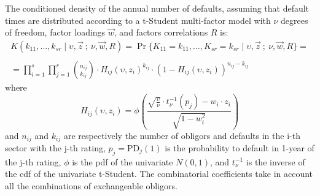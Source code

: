 \documentclass[11pt,fleqn]{book} %
\begin{document}
\begin{proposition}
	The conditioned density of the annual number of defaults, assuming 
	that default times are distributed according to a t-Student multi-factor 
	model with $\nu$ degrees of freedom, factor loadings $\vec{w}$, and 
	factors correlations $R$ is:
	\begin{displaymath}
		\begin{array}{l}
			K(k_{11},\dots,k_{sr} \mid \upsilon,\vec{z}\ ;\ \nu,\vec{w}, R) = 
			\Pr\{K_{11}=k_{11},\dots,K_{sr}=k_{sr} \mid \upsilon,\vec{z}\ ;\ \nu, \vec{w}, R\} = \\
			                                                                                                                                 \\
			= \displaystyle \prod_{i=1}^s \prod_{j=1}^r \binom{n_{ij}}{k_{ij}} \cdot
			H_{ij}(\upsilon,z_i)^{k_{ij}} \cdot
			\left( 1 - H_{ij}(\upsilon,z_i) \right)^{n_{ij}-k_{ij}}
		\end{array}
	\end{displaymath}
	where
	\begin{displaymath}
		H_{ij}(\upsilon,z_i) = \phi\left(  
		\frac{\sqrt{\frac{\upsilon}{\nu}} \cdot t_{\nu}^{-1}(p_j) - w_i\cdot z_i}{\sqrt{1-w_i^2}}
		\right)
	\end{displaymath}
	and $n_{ij}$ and $k_{ij}$ are respectively the number of obligors and 
	defaults in the i-th sector with the j-th rating, $p_j = \text{PD}_j(1)$ 
	is the probability to default in 1-year of the j-th rating,
	$\phi$ is the pdf of the univariate $N(0,1)$, and $t_{\nu}^{-1}$ is the 
	inverse of the cdf of the univariate t-Student. The combinatorial coefficients 
	take in account all the combinations of exchangeable obligors.
\end{proposition}
\end{document}
